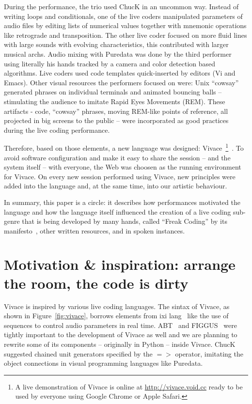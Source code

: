 \documentclass[letterpaper, 12pt]{article}
\begin{document}
During the performance, the trio used ChucK in an uncommon
way. Instead of writing loops and conditionals, one of the live coders
manipulated parameters of audio files by editing lists of numerical
values together with mnemonic operations like retrograde and
transposition.  The other live coder focused on more fluid lines with
large sounds with evolving characteristics, this contributed with
larger musical archs.  Audio mixing with Puredata was done by the
third performer using literally his hands tracked by a camera and
color detection based algorithms. Live coders used code templates
quick-inserted by editors (Vi and Emacs). Other visual resources the
performers focused on were: Unix ``cowsay'' generated phrases on
individual terminals and animated bouncing balls -- stimulating the
audience to imitate Rapid Eyes Movements (REM). These artifacts -
code, ``cowsay'' phrases, moving REM-like points of reference, all
projected in big screens to the public -- were incorporated as good
practices during the live coding performance.

Therefore, based on those elements, a new language was designed:
Vivace~\footnote{A live demonstration of Vivace is online at
  \url{http://vivace.void.cc} ready to be used by everyone using
  Google Chrome or Apple Safari.}~\citep*{Vivace}.  To avoid software
configuration and make it easy to share the session -- and the system
itself -- with everyone, the Web was choosen as the running
environment for Vivace. On every new session performed using Vivace,
new principles were added into the language and, at the same time,
into our artistic behaviour.

In summary, this paper is a circle: it describes how performances
motivated the language and how the language itself influenced the
creation of a live coding sub-genre that is being developed by many
hands, called ``Freak Coding'' by its manifesto~\citep*{freak}, other
written resources, and in spoken instances.

\parskip 18pt

\section{Motivation \& inspiration: arrange the room, the code is dirty}

Vivace is inspired by various live coding languages. The sintax of
Vivace, as shown in Figure~\ref{fig:vivace}, borrows elements from ixi
lang~\citep{magnusson2011ixi} like the use of sequences to control
audio parameters in real time. ABT~\citep{fabbri} and
FIGGUS~\citep{fabbri2} were tightly important to the development of
Vivace as well and we are planning to rewrite some of its components
-- originally in Python -- inside Vivace. ChucK suggested chained unit
generators specified by the $=>$ operator, imitating the object
connections in visual programming languages like Puredata.
\end{document}
